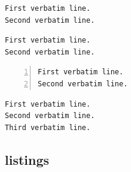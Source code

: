 %

\begin{filecontents*}{\democodefile}
\begin{Verbatim}[frame=single,label=My text]
First verbatim line.
Second verbatim line.
\end{Verbatim}
\end{filecontents*}

%

\begin{filecontents*}{\democodefile}
\begin{Verbatim}[frame=topline,
  framesep=4mm,
  label=\fbox{\Large\emph{The code}}]
First verbatim line.
Second verbatim line.
\end{Verbatim}
\end{filecontents*}

%

\begin{filecontents*}{\democodefile}
\begin{Verbatim}[numbers=left]
First verbatim line.
Second verbatim line.
\end{Verbatim}
\end{filecontents*}

%

\begin{filecontents*}{\democodefile}
\renewcommand{\FancyVerbFormatLine}[1]{%
   \ifodd\value{FancyVerbLine}%
      \MakeUppercase{#1}%
   \else%
      #1%
   \fi%
}%
\begin{Verbatim}
First verbatim line.
Second verbatim line.
Third verbatim line.
\end{Verbatim}

\renewcommand{\FancyVerbFormatLine}{}
\end{filecontents*}

%


\subsection{listings}
\label{sec:demo:listings}

